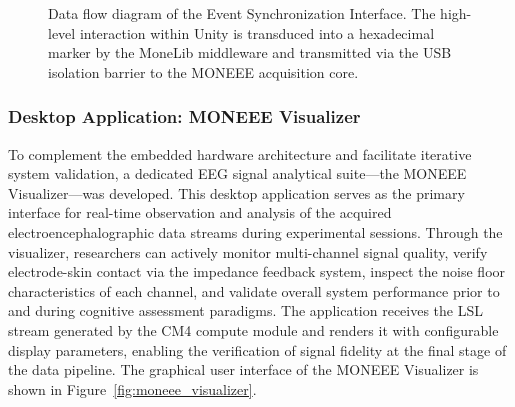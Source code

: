 \begin{figure}[H]
    \caption{Data flow diagram of the Event Synchronization Interface. The high-level interaction within Unity is transduced into a hexadecimal marker by the MoneLib middleware and transmitted via the USB isolation barrier to the MONEEE acquisition core.}
    \label{fig:usb_sync_flow}
\end{figure}

\subsubsection{Desktop Application: MONEEE Visualizer}
\label{subsubsec:moneee_visualizer}

To complement the embedded hardware architecture and facilitate iterative system validation, a dedicated EEG signal analytical suite---the MONEEE Visualizer---was developed. This desktop application serves as the primary interface for real-time observation and analysis of the acquired electroencephalographic data streams during experimental sessions. Through the visualizer, researchers can actively monitor multi-channel signal quality, verify electrode-skin contact via the impedance feedback system, inspect the noise floor characteristics of each channel, and validate overall system performance prior to and during cognitive assessment paradigms. The application receives the LSL stream generated by the CM4 compute module and renders it with configurable display parameters, enabling the verification of signal fidelity at the final stage of the data pipeline. The graphical user interface of the MONEEE Visualizer is shown in Figure~\ref{fig:moneee_visualizer}.

